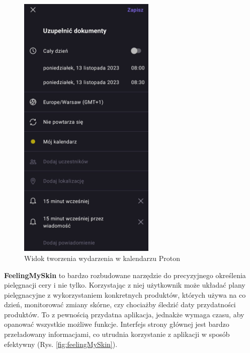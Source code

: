 \begin{figure}[t]
\begin{minipage}{0.4\textwidth}
		\includegraphics[height=13cm, keepaspectratio]{images/analiza/protonCalendar}
		\caption{Widok tworzenia wydarzenia w kalendarzu Proton}
		\label{fig:protonCalendar}
	\end{minipage}
\end{figure}

\newpage
\textbf{FeelingMySkin} to bardzo rozbudowane narzędzie do precyzyjnego określenia pielęgnacji cery i nie tylko.
Korzystając z niej użytkownik może układać plany pielęgnacyjne z wykorzystaniem konkretnych produktów,
których używa na co dzień, monitorować zmiany skórne, czy chociażby śledzić daty przydatności produktów.
To z pewnością przydatna aplikacja, jednakże wymaga czasu, aby opanować wszystkie możliwe funkcje.
Interfejs strony głównej jest bardzo przeładowany informacjami, co utrudnia korzystanie z aplikacji w sposób efektywny (Rys. \ref{fig:feelingMySkin}).

